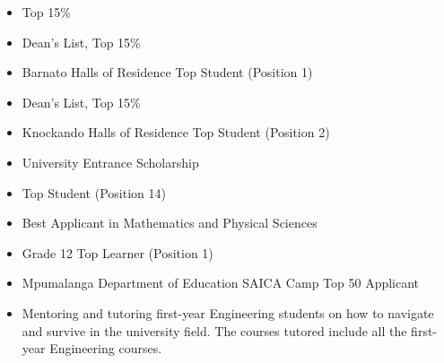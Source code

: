 \documentclass[10pt,a4paper,ragged2e]{altacv}
\begin{document}




\begin{itemize}
\item Top 15\%
\end{itemize}

\begin{itemize}
\item Dean's List, Top 15\%
\item Barnato Halls of Residence Top Student (Position 1)
\end{itemize}

\begin{itemize}
\item Dean's List, Top 15\%
\item Knockando Halls of Residence Top Student (Position 2)
\item University Entrance Scholarship
\end{itemize}


\begin{itemize}
\item Top Student (Position 14)
\item Best Applicant in Mathematics and Physical Sciences
\end{itemize}


\begin{itemize}
\item Grade 12 Top Learner (Position 1)
\item Mpumalanga Department of Education SAICA Camp Top 50 Applicant
\end{itemize}


\clearpage





\begin{itemize}

\item Mentoring and tutoring first-year Engineering students on how to navigate and survive in the university field. The courses tutored include all the first-year Engineering courses.

\end{itemize}
\end{document}
